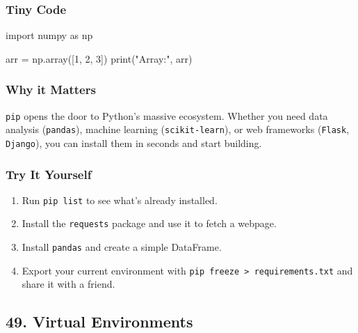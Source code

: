 \documentclass[
  letterpaper,
  DIV=11,
  numbers=noendperiod]{scrreprt}
\newenvironment{Shaded}{\begin{snugshade}}{\end{snugshade}}
\newcommand{\BuiltInTok}[1]{\textcolor[rgb]{0.00,0.23,0.31}{#1}}
\newcommand{\DecValTok}[1]{\textcolor[rgb]{0.68,0.00,0.00}{#1}}
\newcommand{\ImportTok}[1]{\textcolor[rgb]{0.00,0.46,0.62}{#1}}
\newcommand{\NormalTok}[1]{\textcolor[rgb]{0.00,0.23,0.31}{#1}}
\newcommand{\OperatorTok}[1]{\textcolor[rgb]{0.37,0.37,0.37}{#1}}
\newcommand{\StringTok}[1]{\textcolor[rgb]{0.13,0.47,0.30}{#1}}
\providecommand{\tightlist}{%
  \setlength{\itemsep}{0pt}\setlength{\parskip}{0pt}}
\begin{document}
\subsubsection{Tiny Code}\label{tiny-code-47}

\begin{Shaded}
\begin{Highlighting}[]
\ImportTok{import}\NormalTok{ numpy }\ImportTok{as}\NormalTok{ np}

\NormalTok{arr }\OperatorTok{=}\NormalTok{ np.array([}\DecValTok{1}\NormalTok{, }\DecValTok{2}\NormalTok{, }\DecValTok{3}\NormalTok{])}
\BuiltInTok{print}\NormalTok{(}\StringTok{"Array:"}\NormalTok{, arr)}
\end{Highlighting}
\end{Shaded}

\subsubsection{Why it Matters}\label{why-it-matters-47}

\texttt{pip} opens the door to Python's massive ecosystem. Whether you
need data analysis (\texttt{pandas}), machine learning
(\texttt{scikit-learn}), or web frameworks (\texttt{Flask},
\texttt{Django}), you can install them in seconds and start building.

\subsubsection{Try It Yourself}\label{try-it-yourself-47}

\begin{enumerate}
\def\labelenumi{\arabic{enumi}.}
\tightlist
\item
  Run \texttt{pip\ list} to see what's already installed.
\item
  Install the \texttt{requests} package and use it to fetch a webpage.
\item
  Install \texttt{pandas} and create a simple DataFrame.
\item
  Export your current environment with
  \texttt{pip\ freeze\ \textgreater{}\ requirements.txt} and share it
  with a friend.
\end{enumerate}

\subsection{49. Virtual Environments}\label{virtual-environments}
\end{document}
